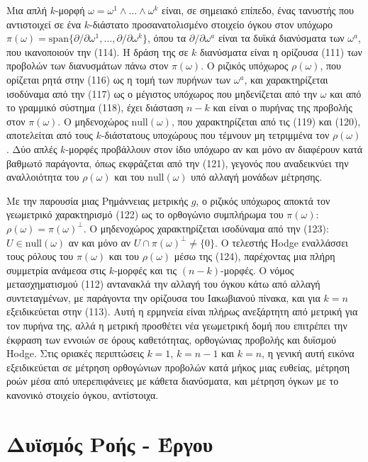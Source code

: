 \documentclass[12pt]{article}
\begin{document}
Μια απλή $k$-μορφή $\omega = \omega^1 \wedge \dots \wedge \omega^k$ είναι, σε σημειακό επίπεδο, ένας τανυστής που αντιστοιχεί σε ένα $k$-διάστατο προσανατολισμένο στοιχείο όγκου στον υπόχωρο $\pi(\omega) = \text{span}\{\partial / \partial \omega^1, \dots, \partial / \partial \omega^k\}$, όπου τα $\partial / \partial \omega^a$ είναι τα δυϊκά διανύσματα των $\omega^a$, που ικανοποιούν την (114). Η δράση της σε $k$ διανύσματα είναι η ορίζουσα (111) των προβολών των διανυσμάτων πάνω στον $\pi(\omega)$. Ο ριζικός υπόχωρος $\rho(\omega)$, που ορίζεται ρητά στην (116) ως η τομή των πυρήνων των $\omega^a$, και χαρακτηρίζεται ισοδύναμα από την (117) ως ο μέγιστος υπόχωρος που μηδενίζεται από την $\omega$ και από το γραμμικό σύστημα (118), έχει διάσταση $n-k$ και είναι ο πυρήνας της προβολής στον $\pi(\omega)$. Ο μηδενοχώρος $\text{null}(\omega)$, που χαρακτηρίζεται από τις (119) και (120), αποτελείται από τους $k$-διάστατους υποχώρους που τέμνουν μη τετριμμένα τον $\rho(\omega)$. Δύο απλές $k$-μορφές προβάλλουν στον ίδιο υπόχωρο αν και μόνο αν διαφέρουν κατά βαθμωτό παράγοντα, όπως εκφράζεται από την (121), γεγονός που αναδεικνύει την αναλλοιότητα του $\rho(\omega)$ και του $\text{null}(\omega)$ υπό αλλαγή μονάδων μέτρησης.

Με την παρουσία μιας Ρημάννειας μετρικής $g$, ο ριζικός υπόχωρος αποκτά τον γεωμετρικό χαρακτηρισμό (122) ως το ορθογώνιο συμπλήρωμα του $\pi(\omega)$: $\rho(\omega) = \pi(\omega)^\perp$. Ο μηδενοχώρος χαρακτηρίζεται ισοδύναμα από την (123): $U \in \text{null}(\omega)$ αν και μόνο αν $U \cap \pi(\omega)^\perp \neq \{0\}$. Ο τελεστής Hodge εναλλάσσει τους ρόλους του $\pi(\omega)$ και του $\rho(\omega)$ μέσω της (124), παρέχοντας μια πλήρη συμμετρία ανάμεσα στις $k$-μορφές και τις $(n-k)$-μορφές. Ο νόμος μετασχηματισμού (112) αντανακλά την αλλαγή του όγκου κάτω από αλλαγή συντεταγμένων, με παράγοντα την ορίζουσα του Ιακωβιανού πίνακα, και για $k=n$ εξειδικεύεται στην (113). Αυτή η ερμηνεία είναι πλήρως ανεξάρτητη από μετρική για τον πυρήνα της, αλλά η μετρική προσθέτει νέα γεωμετρική δομή που επιτρέπει την έκφραση των εννοιών σε όρους καθετότητας, ορθογώνιας προβολής και δυϊσμού Hodge. Στις οριακές περιπτώσεις $k=1$, $k=n-1$ και $k=n$, η γενική αυτή εικόνα εξειδικεύεται σε μέτρηση ορθογώνιων προβολών κατά μήκος μιας ευθείας, μέτρηση ροών μέσα από υπερεπιφάνειες με κάθετα διανύσματα, και μέτρηση όγκων με το κανονικό στοιχείο όγκου, αντίστοιχα.

\section{Δυϊσμός Ροής - Έργου}
\end{document}

